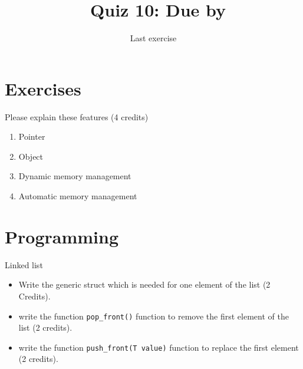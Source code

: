 \documentclass[11pt]{article}
\begin{document}
\title{\coursename~Quiz 10: Due by }
\date{Last exercise}
\maketitle

\medskip


\section*{Exercises}
Please explain these features (4 credits)
\begin{enumerate}
\item Pointer
\item Object
\item Dynamic memory management 
\item Automatic memory management
\end{enumerate}

\section*{Programming}

Linked list
\begin{itemize}
\item Write the generic struct which is needed for one element of the list (2 Credits).
\item write the function \lstinline|pop_front()| function to remove the first element of the list (2 credits).
\item write the function \lstinline|push_front(T value)| function to replace the first element (2 credits).
\end{itemize}

\doclicenseThis 
\end{document}

